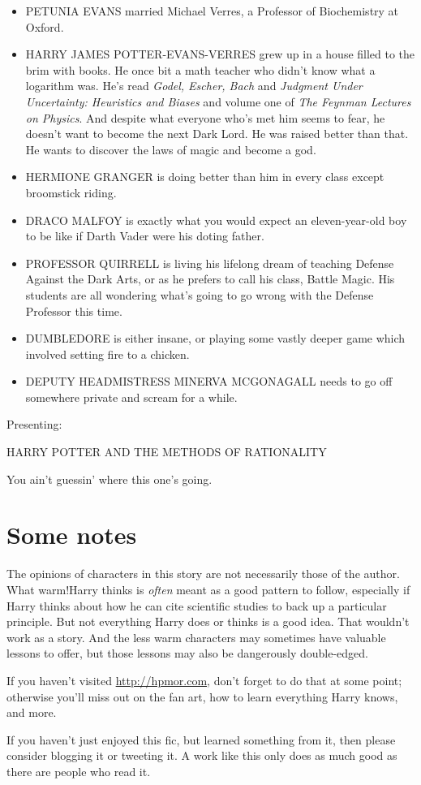 \begin{itemize}
\item PETUNIA EVANS married Michael Verres, a Professor of Biochemistry at Oxford.
\item HARRY JAMES POTTER-EVANS-VERRES grew up in a house filled to the brim with books. He once bit a math teacher who didn't know what a logarithm was. He's read \emph{Godel, Escher, Bach} and \emph{Judgment Under Uncertainty: Heuristics and Biases} and volume one of \emph{The Feynman Lectures on Physics}. And despite what everyone who's met him seems to fear, he doesn't want to become the next Dark Lord. He was raised better than that. He wants to discover the laws of magic and become a god.
\item HERMIONE GRANGER is doing better than him in every class except broomstick riding.
\item DRACO MALFOY is exactly what you would expect an eleven-year-old boy to be like if Darth Vader were his doting father.
\item PROFESSOR QUIRRELL is living his lifelong dream of teaching Defense Against the Dark Arts, or as he prefers to call his class, Battle Magic. His students are all wondering what's going to go wrong with the Defense Professor this time.
\item DUMBLEDORE is either insane, or playing some vastly deeper game which involved setting fire to a chicken.
\item DEPUTY HEADMISTRESS MINERVA MCGONAGALL needs to go off somewhere private and scream for a while.
\end{itemize}

\begin{center}
Presenting:

HARRY POTTER AND THE METHODS OF RATIONALITY

You ain't guessin' where this one's going.
\end{center}

\section*{Some notes}
The opinions of characters in this story are not necessarily those of the author. What warm!Harry thinks is \emph{often} meant as a good pattern to follow, especially if Harry thinks about how he can cite scientific studies to back up a particular principle. But not everything Harry does or thinks is a good idea. That wouldn't work as a story. And the less warm characters may sometimes have valuable lessons to offer, but those lessons may also be dangerously double-edged.

If you haven't visited \url{http://hpmor.com}, don't forget to do that at some point; otherwise you'll miss out on the fan art, how to learn everything Harry knows, and more.

If you haven't just enjoyed this fic, but learned something from it, then please consider blogging it or tweeting it. A work like this only does as much good as there are people who read it.

